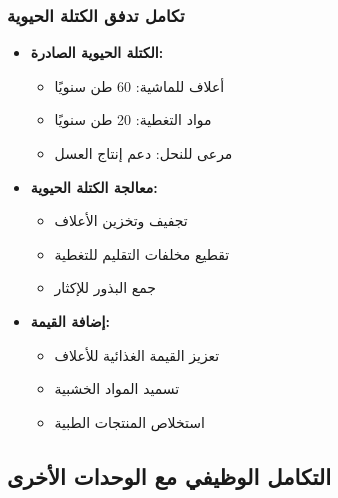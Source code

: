 \subsubsection{تكامل تدفق الكتلة الحيوية}
\begin{itemize}
    \item \textbf{الكتلة الحيوية الصادرة:}
    \begin{itemize}
        \item أعلاف للماشية: 60 طن سنويًا
        \item مواد التغطية: 20 طن سنويًا
        \item مرعى للنحل: دعم إنتاج العسل
    \end{itemize}
    \item \textbf{معالجة الكتلة الحيوية:}
    \begin{itemize}
        \item تجفيف وتخزين الأعلاف
        \item تقطيع مخلفات التقليم للتغطية
        \item جمع البذور للإكثار
    \end{itemize}
    \item \textbf{إضافة القيمة:}
    \begin{itemize}
        \item تعزيز القيمة الغذائية للأعلاف
        \item تسميد المواد الخشبية
        \item استخلاص المنتجات الطبية
    \end{itemize}
\end{itemize}

\subsection{التكامل الوظيفي مع الوحدات الأخرى}

